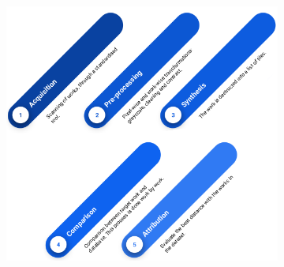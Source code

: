 \begin{toReview}
\begin{figure}[ht]
	\centering
	\begin{subfigure}{0.9\linewidth}
		\includegraphics[width=\linewidth]{Figures/process.png}
	\end{subfigure}
\end{figure}

\end{toReview}

\newpage


\newpage


\newpage


\newpage


%

